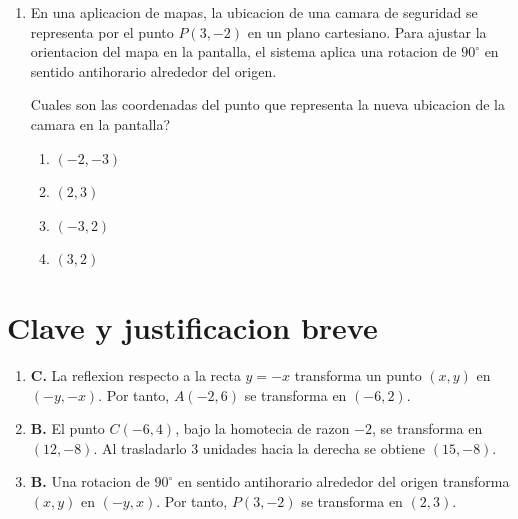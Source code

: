 \documentclass[12pt]{article}
\begin{document}
\begin{enumerate}[label=\textbf{\arabic*.}, itemsep=1.05cm]
\textquestiondown Cual es la imagen del punto $C$ luego de aplicar ambas transformaciones?

\begin{enumerate}[label=\Alph*)]
  \item $(-15,8)$
  \item $(15,-8)$
  \item $(9,-8)$
  \item $(12,-5)$
\end{enumerate}

\Needspace{0.48\textheight}
\item
En una aplicacion de mapas, la ubicacion de una camara de seguridad se representa por el punto $P(3,-2)$ en un plano cartesiano. Para ajustar la orientacion del mapa en la pantalla, el sistema aplica una rotacion de $90^\circ$ en sentido antihorario alrededor del origen.

\textquestiondown Cuales son las coordenadas del punto que representa la nueva ubicacion de la camara en la pantalla?

\begin{enumerate}[label=\Alph*)]
  \item $(-2,-3)$
  \item $(2,3)$
  \item $(-3,2)$
  \item $(3,2)$
\end{enumerate}

\end{enumerate}

\section*{Clave y justificacion breve}

\begin{enumerate}[label=\textbf{\arabic*.}]
  \item \textbf{C.} La reflexion respecto a la recta $y=-x$ transforma un punto $(x,y)$ en $(-y,-x)$. Por tanto, $A(-2,6)$ se transforma en $(-6,2)$.
  \item \textbf{B.} El punto $C(-6,4)$, bajo la homotecia de razon $-2$, se transforma en $(12,-8)$. Al trasladarlo $3$ unidades hacia la derecha se obtiene $(15,-8)$.
  \item \textbf{B.} Una rotacion de $90^\circ$ en sentido antihorario alrededor del origen transforma $(x,y)$ en $(-y,x)$. Por tanto, $P(3,-2)$ se transforma en $(2,3)$.
\end{enumerate}
\end{document}
